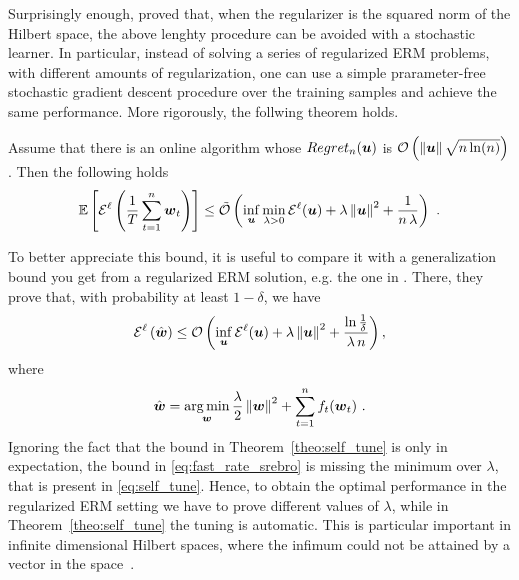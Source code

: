 Surprisingly enough, \citep{Orabona14} proved that, when the regularizer is the squared norm of the Hilbert space, the above lenghty procedure can be avoided with a stochastic learner.
In particular, instead of solving a series of regularized ERM problems, with different amounts of regularization, one can use a simple prarameter-free stochastic gradient descent procedure over the training samples and achieve the same performance.
More rigorously, the follwing theorem holds.
\begin{theorem}
\label{theo:self_tune}
Assume that there is an online algorithm whose $Regret_n(\boldsymbol{u})$ is $\mathcal{O}\left(\left\|{\boldsymbol{u}}\right\|\sqrt{n \ln(n)}\right)$. Then the following holds
\begin{equation}
\label{eq:self_tune}
\mathbb{E}\left[\mathcal{E}^{\ell}\left(\frac{1}{T} \sum_{t=1}^n \boldsymbol{w}_t\right)\right] \leq \tilde{\mathcal{O}}\left(\inf_{\boldsymbol{u}} \min_{\lambda>0} \mathcal{E}^{\ell}(\boldsymbol{u}) + \lambda \left\|{\boldsymbol{u}}\right\|^2 +\frac{1}{n \, \lambda} \right)~.
\end{equation}
\end{theorem}
To better appreciate this bound, it is useful to compare it with a generalization bound you get from a regularized \ac{ERM} solution, e.g. the one in \citet{SridharanSSS09}.
There, they prove that, with probability at least $1-\delta$, we have
\begin{equation}
\label{eq:fast_rate_srebro}
\mathcal{E}^{\ell}\left(\hat{\boldsymbol{w}}\right) \leq \mathcal{O}\left(\inf_{\boldsymbol{u}} \mathcal{E}^{\ell}(\boldsymbol{u}) + \lambda \left\|{\boldsymbol{u}}\right\|^2 +\frac{\ln \frac{1}{\delta}}{\lambda \, n} \right),
\end{equation}
where 
\begin{align*}
\hat{\boldsymbol{w}}=\operatorname*{arg\,min}_{\boldsymbol{w}} \frac{\lambda}{2}\left\|{\boldsymbol{w}}\right\|^2 + \sum_{t=1}^n f_t(\boldsymbol{w}_t)~.
\end{align*}
Ignoring the fact that the bound in Theorem~\ref{theo:self_tune} is only in expectation, the bound in \eqref{eq:fast_rate_srebro} is missing the minimum over $\lambda$, that is present in \eqref{eq:self_tune}. Hence, to obtain the optimal performance in the regularized \ac{ERM} setting we have to prove different values of $\lambda$, while in Theorem~\ref{theo:self_tune} the tuning is automatic. This is particular important in infinite dimensional Hilbert spaces, where the infimum could not be attained by a vector in the space~\cite{Orabona14}.

